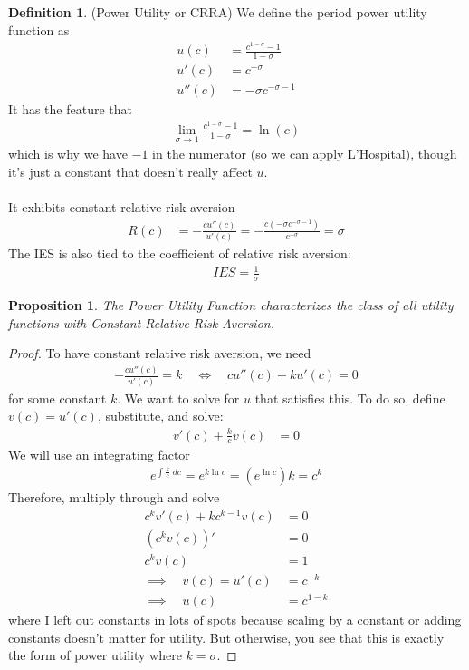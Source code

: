 \documentclass[12pt]{article}
\theoremstyle{plain}
\newtheorem{prop}[thm]{Proposition}
\theoremstyle{definition}
\newtheorem{defn}[thm]{Definition}
\theoremstyle{remark}
\newcommand{\ra}{\rightarrow}
\begin{document}
\begin{defn}(Power Utility or CRRA)
We define the period power utility function as
\begin{align*}
  u(c) &= \frac{c^{1-\sigma}-1}{1-\sigma} \\
  u'(c) &= c^{-\sigma} \\
  u''(c) &= -\sigma c^{-\sigma-1}
\end{align*}
It has the feature that
\begin{align*}
  \lim_{\sigma\ra 1}
  \frac{c^{1-\sigma}-1}{1-\sigma}
  = \ln(c)
\end{align*}
which is why we have $-1$ in the numerator (so we can apply L'Hospital),
though it's just a constant that doesn't really affect $u$.
\\
\\
It exhibits constant relative risk aversion
\begin{align*}
  R(c) &=
  -\frac{c u''(c)}{u'(c)}
  = -\frac{c (-\sigma c^{-\sigma-1})}{c^{-\sigma}}
  = \sigma
\end{align*}
The IES is also tied to the coefficient of relative risk aversion:
\begin{align*}
  IES
  = \frac{1}{\sigma}
\end{align*}
\end{defn}

\begin{prop}
The Power Utility Function characterizes the class of all utility
functions with Constant Relative Risk Aversion.
\end{prop}
\begin{proof}
To have constant relative risk aversion, we need
\begin{align*}
  -\frac{cu''(c)}{u'(c)} = k
  \quad\iff\quad
  cu''(c) + ku'(c) = 0
\end{align*}
for some constant $k$. We want to solve for $u$ that satisfies this. To
do so, define $v(c)=u'(c)$, substitute, and solve:
\begin{align*}
  v'(c) + \frac{k}{c}v(c) &= 0
\end{align*}
We will use an integrating factor
\begin{align*}
  e^{\int \frac{k}{c} \; dc}=e^{k\ln c} = (e^{\ln c})k = c^k
\end{align*}
Therefore, multiply through and solve
\begin{align*}
  c^k v'(c) + kc^{k-1}v(c) &= 0 \\
  \left(c^k v(c)\right)' &= 0 \\
  c^k v(c) &= 1 \\
  \implies \quad v(c) = u'(c) &= c^{-k} \\
  \implies \quad u(c) &= c^{1-k}
\end{align*}
where I left out constants in lots of spots because scaling by a
constant or adding constants doesn't matter for utility. But otherwise,
you see that this is exactly the form of power utility where $k=\sigma$.
\end{proof}
\end{document}
